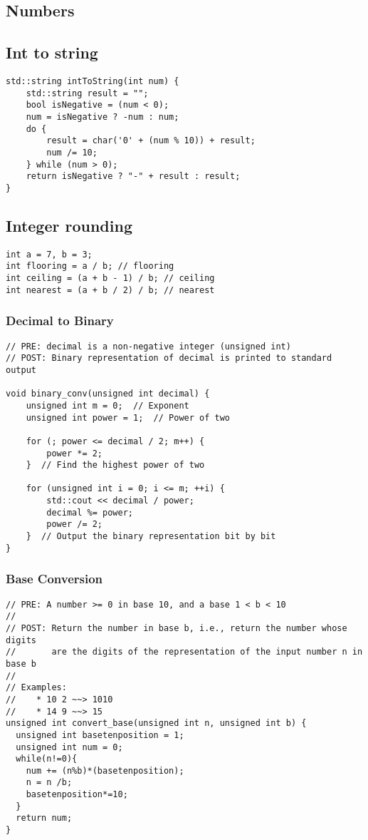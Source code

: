 
\subsection{Numbers}
\subsection{Int to string}

\begin{lstlisting}[style = codeexpert]
std::string intToString(int num) {
    std::string result = "";
    bool isNegative = (num < 0);
    num = isNegative ? -num : num;
    do {
        result = char('0' + (num % 10)) + result;
        num /= 10;
    } while (num > 0);
    return isNegative ? "-" + result : result;
}
\end{lstlisting}
\subsection{Integer rounding}
\begin{lstlisting}[style = codeexpert]
int a = 7, b = 3;
int flooring = a / b; // flooring
int ceiling = (a + b - 1) / b; // ceiling
int nearest = (a + b / 2) / b; // nearest
\end{lstlisting}

\subsubsection{Decimal to Binary}
\begin{lstlisting}[style = codeexpert]
// PRE: decimal is a non-negative integer (unsigned int)
// POST: Binary representation of decimal is printed to standard output

void binary_conv(unsigned int decimal) {
    unsigned int m = 0;  // Exponent
    unsigned int power = 1;  // Power of two

    for (; power <= decimal / 2; m++) {
        power *= 2;
    }  // Find the highest power of two

    for (unsigned int i = 0; i <= m; ++i) {
        std::cout << decimal / power;
        decimal %= power;
        power /= 2;
    }  // Output the binary representation bit by bit
}

\end{lstlisting}
\columnbreak
\subsubsection{Base Conversion}
\begin{lstlisting}[style = codeexpert]
// PRE: A number >= 0 in base 10, and a base 1 < b < 10
//
// POST: Return the number in base b, i.e., return the number whose digits 
//       are the digits of the representation of the input number n in base b
//
// Examples:
//    * 10 2 ~~> 1010
//    * 14 9 ~~> 15
unsigned int convert_base(unsigned int n, unsigned int b) {
  unsigned int basetenposition = 1;
  unsigned int num = 0;
  while(n!=0){
    num += (n%b)*(basetenposition);
    n = n /b;
    basetenposition*=10;
  }
  return num;
}

\end{lstlisting}

